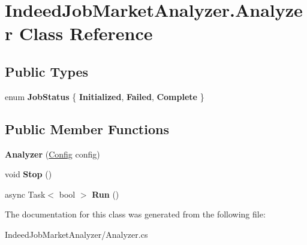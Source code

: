 \hypertarget{class_indeed_job_market_analyzer_1_1_analyzer}{}\section{Indeed\+Job\+Market\+Analyzer.\+Analyzer Class Reference}
\label{class_indeed_job_market_analyzer_1_1_analyzer}
\subsection*{Public Types}
\begin{DoxyCompactItemize}
\item 
\hypertarget{class_indeed_job_market_analyzer_1_1_analyzer_a4f733697c87f19b437eb02be903061db}{}enum {\bfseries Job\+Status} \{ {\bfseries Initialized}, 
{\bfseries Failed}, 
{\bfseries Complete}
 \}\label{class_indeed_job_market_analyzer_1_1_analyzer_a4f733697c87f19b437eb02be903061db}

\end{DoxyCompactItemize}
\subsection*{Public Member Functions}
\begin{DoxyCompactItemize}
\item 
\hypertarget{class_indeed_job_market_analyzer_1_1_analyzer_acfb7c17a1d60388a551b2ce0bdcb89fa}{}{\bfseries Analyzer} (\hyperlink{class_indeed_job_market_analyzer_1_1_config}{Config} config)\label{class_indeed_job_market_analyzer_1_1_analyzer_acfb7c17a1d60388a551b2ce0bdcb89fa}

\item 
\hypertarget{class_indeed_job_market_analyzer_1_1_analyzer_a20724773dbc45a22359f6352b320df2c}{}void {\bfseries Stop} ()\label{class_indeed_job_market_analyzer_1_1_analyzer_a20724773dbc45a22359f6352b320df2c}

\item 
\hypertarget{class_indeed_job_market_analyzer_1_1_analyzer_a24feea414220354fa9b557bcc1746cc2}{}async Task$<$ bool $>$ {\bfseries Run} ()\label{class_indeed_job_market_analyzer_1_1_analyzer_a24feea414220354fa9b557bcc1746cc2}

\end{DoxyCompactItemize}


The documentation for this class was generated from the following file\+:\begin{DoxyCompactItemize}
\item 
Indeed\+Job\+Market\+Analyzer/Analyzer.\+cs\end{DoxyCompactItemize}
